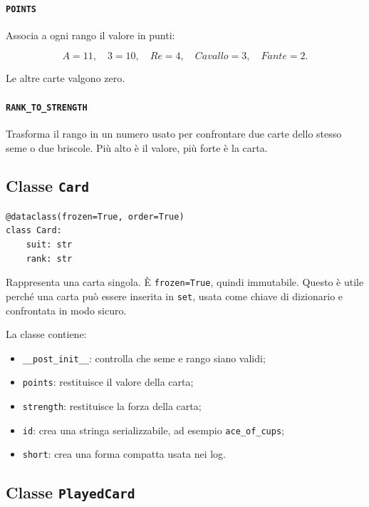 \documentclass[11pt,a4paper]{article}
\begin{document}
\paragraph{\texttt{POINTS}}

Associa a ogni rango il valore in punti:

\[
A=11,\quad 3=10,\quad Re=4,\quad Cavallo=3,\quad Fante=2.
\]

Le altre carte valgono zero.

\paragraph{\texttt{RANK\_TO\_STRENGTH}}

Trasforma il rango in un numero usato per confrontare due carte dello stesso
seme o due briscole. Più alto è il valore, più forte è la carta.

\subsection{Classe \texttt{Card}}

\begin{verbatim}
@dataclass(frozen=True, order=True)
class Card:
    suit: str
    rank: str
\end{verbatim}

Rappresenta una carta singola. È \texttt{frozen=True}, quindi immutabile. Questo
è utile perché una carta può essere inserita in \texttt{set}, usata come chiave
di dizionario e confrontata in modo sicuro.

La classe contiene:

\begin{itemize}
  \item \texttt{\_\_post\_init\_\_}: controlla che seme e rango siano validi;
  \item \texttt{points}: restituisce il valore della carta;
  \item \texttt{strength}: restituisce la forza della carta;
  \item \texttt{id}: crea una stringa serializzabile, ad esempio
  \texttt{ace\_of\_cups};
  \item \texttt{short}: crea una forma compatta usata nei log.
\end{itemize}

\subsection{Classe \texttt{PlayedCard}}
\end{document}
